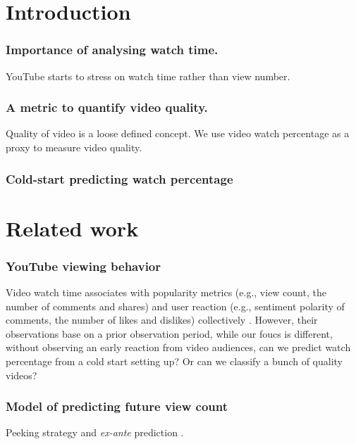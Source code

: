 \section{Introduction}

\subsubsection{Importance of analysing watch time.} YouTube starts to stress on watch time rather than view number.

\subsubsection{A metric to quantify video quality.} Quality of video is a loose defined concept. We use video watch percentage as a proxy to measure video quality.

\subsubsection{Cold-start predicting watch percentage}


\section{Related work}

\subsubsection{YouTube viewing behavior} Video watch time associates with popularity metrics (e.g., view count, the number of comments and shares) and user reaction (e.g., sentiment polarity of comments, the number of likes and dislikes) collectively \cite{park:2016engagement}. However, their observations base on a prior observation period, while our foucs is different, without observing an early reaction from video audiences, can we predict watch percentage from a cold start setting up? Or can we classify a bunch of quality videos?

\subsubsection{Model of predicting future view count} Peeking strategy and \textit{ex-ante} prediction \cite{martin2016exploring}.


